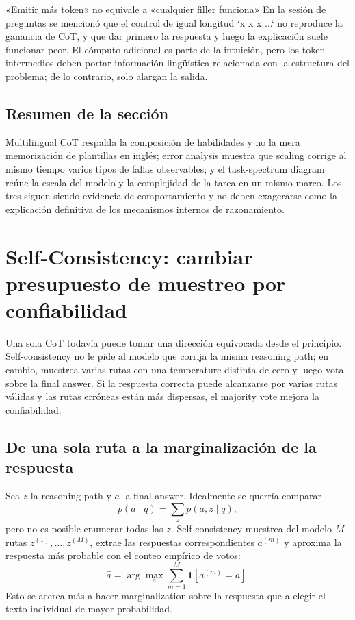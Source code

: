 \documentclass[a4paper]{article}
\begin{document}
\begin{warningbox}{«Emitir más token» no equivale a «cualquier filler funciona»}
En la sesión de preguntas se mencionó que el control de igual longitud `x x x ...` no reproduce la ganancia de CoT, y que dar primero la respuesta y luego la explicación suele funcionar peor. El cómputo adicional es parte de la intuición, pero los token intermedios deben portar información lingüística relacionada con la estructura del problema; de lo contrario, solo alargan la salida.
\end{warningbox}

\subsection{Resumen de la sección}

Multilingual CoT respalda la composición de habilidades y no la mera memorización de plantillas en inglés; error analysis muestra que scaling corrige al mismo tiempo varios tipos de fallas observables; y el task-spectrum diagram reúne la escala del modelo y la complejidad de la tarea en un mismo marco. Los tres siguen siendo evidencia de comportamiento y no deben exagerarse como la explicación definitiva de los mecanismos internos de razonamiento.
\section{Self-Consistency: cambiar presupuesto de muestreo por confiabilidad}

Una sola CoT todavía puede tomar una dirección equivocada desde el principio. Self-consistency no le pide al modelo que corrija la misma reasoning path; en cambio, muestrea varias rutas con una temperature distinta de cero y luego vota sobre la final answer. Si la respuesta correcta puede alcanzarse por varias rutas válidas y las rutas erróneas están más dispersas, el majority vote mejora la confiabilidad.

\subsection{De una sola ruta a la marginalización de la respuesta}

Sea $z$ la reasoning path y $a$ la final answer. Idealmente se querría comparar
\[
p(a\mid q)=\sum_z p(a,z\mid q),
\]
pero no es posible enumerar todas las $z$. Self-consistency muestrea del modelo $M$ rutas $z^{(1)},\ldots,z^{(M)}$, extrae las respuestas correspondientes $a^{(m)}$ y aproxima la respuesta más probable con el conteo empírico de votos:
\[
\hat a=\arg\max_a \sum_{m=1}^{M}\mathbf{1}\!\left[a^{(m)}=a\right].
\]
Esto se acerca más a hacer marginalization sobre la respuesta que a elegir el texto individual de mayor probabilidad.
\end{document}
